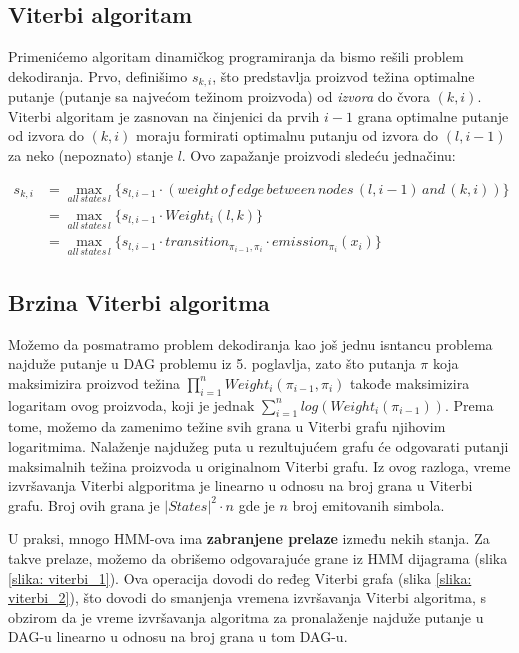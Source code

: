 \subsection{Viterbi algoritam}

Primenićemo algoritam dinamičkog programiranja da bismo rešili problem dekodiranja. Prvo, definišimo $ s_{k, i} $, što predstavlja proizvod težina optimalne putanje (putanje sa najvećom težinom proizvoda) od \textit{izvora} do čvora $ (k, i) $. Viterbi algoritam je zasnovan na činjenici da prvih $ i-1 $ grana optimalne putanje od izvora do $ (k, i) $ moraju formirati optimalnu putanju od izvora do $ (l, i-1) $ za neko (nepoznato) stanje $ l $. Ovo zapažanje proizvodi sledeću jednačinu:

\begin{equation}
\begin{aligned}
    s_{k, i} &= {\displaystyle \max_{all\,states\,l} \{s_{l, i-1} \cdot (weight\,of\,edge\,between\,nodes\,(l, i-1)\,and\,(k, i))\}} \\
    & = \max_{all\,states\,l} \{s_{l, i-1} \cdot Weight_i(l, k)\}\\
    & = \max_{all\,states\,l} \{s_{l, i-1} \cdot transition_{\pi_{i-1},\pi_i} \cdot emission_{\pi_i}(x_i)\}
\end{aligned}
\end{equation}

\subsection{Brzina Viterbi algoritma}

Možemo da posmatramo problem dekodiranja kao još jednu isntancu problema najduže putanje u DAG problemu iz 5. poglavlja, zato što putanja $ \pi $ koja maksimizira proizvod težina $ {\displaystyle \prod_{i=1}^{n}  Weight_i(\pi_{i-1}, \pi_i)} $ takođe maksimizira logaritam ovog proizvoda,  koji je jednak $ {\displaystyle \sum_{i=1}^{n}  log(Weight_i(\pi_{i-1}))} $. Prema tome, možemo da zamenimo težine svih grana u Viterbi grafu njihovim logaritmima. Nalaženje najdužeg puta u rezultujućem grafu će odgovarati putanji maksimalnih težina proizvoda u originalnom Viterbi grafu. Iz ovog razloga, vreme izvršavanja Viterbi algporitma je linearno u odnosu na broj grana u Viterbi grafu. Broj ovih grana je $ |States|^2 \cdot n $ gde je $ n $ broj emitovanih simbola.

U praksi, mnogo HMM-ova ima \textbf{zabranjene prelaze} između nekih stanja. Za takve prelaze, možemo da obrišemo odgovarajuće grane iz HMM dijagrama (slika \ref{slika: viterbi_1}). Ova operacija dovodi do ređeg Viterbi grafa (slika \ref{slika: viterbi_2}), što dovodi do smanjenja vremena izvršavanja Viterbi algoritma, s obzirom da je vreme izvršavanja algoritma za pronalaženje najduže putanje u DAG-u linearno u odnosu na broj grana u tom DAG-u.

